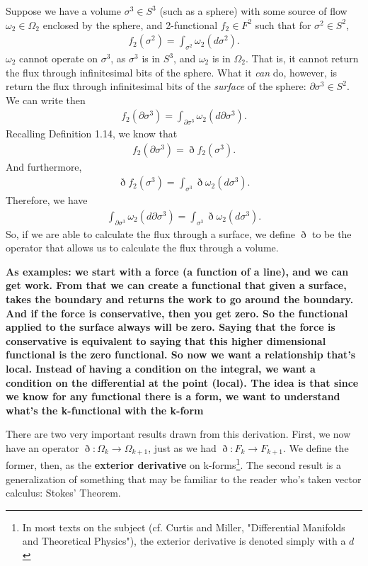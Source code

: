 \documentclass{book}
\begin{document}
Suppose we have a volume $\sigma^3 \in S^3$ (such as a sphere) with some source of flow $\omega_2 \in \Omega_2$ enclosed by the sphere, and 2-functional $f_2 \in F^2$ such that for $\sigma^2 \in S^2$, \begin{gather}f_2(\sigma^2) = \int_{\sigma^2} \omega_2(d\sigma^2).\end{gather} $\omega_2$ cannot operate on $\sigma^3$, as $\sigma^3$ is in $S^3$, and $\omega_2$ is in $\Omega_2$. That is, it cannot return the flux through infinitesimal bits of the sphere. What it \emph{can} do, however, is return the flux through infinitesimal bits of the \emph{surface} of the sphere: $\partial \sigma^3 \in S^2$. We can write then \begin{gather}f_2(\partial\sigma^3) = \int_{\partial\sigma^3} \omega_2 (d\partial\sigma^3).\end{gather} Recalling Definition 1.14, we know that \begin{gather}f_2(\partial\sigma^3) = \eth f_2(\sigma^3).\end{gather} And furthermore, \begin{gather}\eth f_2(\sigma^3) = \int_{\sigma^3} \eth\omega_2(d\sigma^3).\end{gather} Therefore, we have \begin{gather}\int_{\partial \sigma^3} \omega_2(d\partial\sigma^3) = \int_{\sigma^3} \eth \omega_2(d\sigma^3).\end{gather} So, if we are able to calculate the flux through a surface, we define $\eth$ to be the operator that allows us to calculate the flux through a volume. 

\textbf{As examples: we start with a force (a function of a line), and we can get work. From that we can create a functional that given a surface, takes the boundary and returns the work to go around the boundary. And if the force is conservative, then you get zero. So the functional applied to the surface always will be zero. Saying that the force is conservative is equivalent to saying that this higher dimensional functional is the zero functional. So now we want a relationship that's local. Instead of having a condition on the integral, we want a condition on the differential at the point (local). The idea is that since we know for any functional there is a form, we want to understand what's the k-functional with the k-form}

There are two very important results drawn from this derivation. First, we now have an operator $\eth : \Omega_k \to \Omega_{k+1}$, just as we had $\eth : F_k \to F_{k+1}$. We define the former, then, as the \textbf{exterior derivative} on k-forms\footnote{In most texts on the subject (cf. Curtis and Miller, "Differential Manifolds and Theoretical Physics"), the exterior derivative is denoted simply with a $d$}. The second result is a generalization of something that may be familiar to the reader who's taken vector calculus: Stokes' Theorem. 
\end{document}
